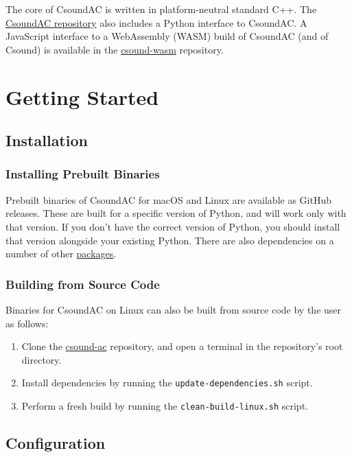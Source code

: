 \documentclass[letterpaper,10pt,DIV=12,parskip=half]{scrartcl}
\begin{document}
\noindent The core of CsoundAC is written in platform-neutral standard C++. The \href{https://github.com/gogins/csound-ac}{CsoundAC repository} also includes a Python interface to CsoundAC. A JavaScript interface to a WebAssembly (WASM) build of CsoundAC (and of Csound) is available in the \href{https://github.com/gogins/csound-wasm}{csound-wasm} repository. 

\section{Getting Started}

\subsection{Installation}

\subsubsection{Installing Prebuilt Binaries}

Prebuilt binaries of CsoundAC for macOS and Linux are available as GitHub releases. These are built for a specific version of Python, and will work only with that version. If you don't have the correct version of Python, you should install that version alongside your existing Python. There are also dependencies on a number of other \href{https://github.com/gogins/csound-ac/blob/master/dependencies/update-dependency-packages.sh}{packages}.

\subsubsection{Building from Source Code}

Binaries for CsoundAC on Linux can also be built from source code by the user as follows:

\begin{enumerate}
\item Clone the \href{https://github.com/gogins/csound-ac}{csound-ac} repository, and open a terminal in the repository's root directory.
\item Install dependencies by running the \lstinline{update-dependencies.sh} script.
\item Perform a fresh build by running the \lstinline{clean-build-linux.sh} script.
\end{enumerate}

\subsection{Configuration}
\end{document}
